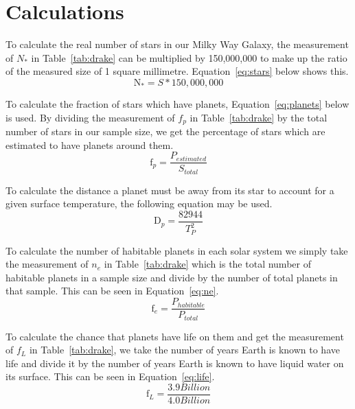 \documentclass{article}
\begin{document}

\section{Calculations}
\label{sec:calc}

To calculate the real number of stars in our Milky Way Galaxy, the measurement of ${N}_{*}$ in Table~\ref{tab:drake} can be
multiplied by 150,000,000 to make up the ratio of the measured size of 1 square millimetre. Equation~\ref{eq:stars} below 
shows this.
\begin{equation}
\label{eq:stars}
\text{N}_{*} = S * 150,000,000
\end{equation}

To calculate the fraction of stars which have planets, Equation~\ref{eq:planets} below is used. By dividing the measurement of
${f}_{p}$ in Table~\ref{tab:drake} by the total number of stars in our sample size, we get the percentage of stars which are 
estimated to have planets around them.
\begin{equation}
\label{eq:planets}
\text{f}_{p} = \frac{{P}_{estimated}}{{S}_{total}}
\end{equation}

To calculate the distance a planet must be away from its star to account for a given surface temperature, the following
equation may be used.
\begin{equation}
\label{eq:mm}
\text{D}_{p} = \frac{82944}{{T}_{P}^{2}}
\end{equation}

To calculate the number of habitable planets in each solar system we simply take the measurement of 
${n}_{e}$ in Table~\ref{tab:drake} which is the total number of habitable planets in a sample size and divide by the number 
of total planets in that sample. This can be seen in Equation~\ref{eq:ne}.
\begin{equation}
\label{eq:ne}
\text{f}_{e} = \frac{{P}_{habitable}}{{P}_{total}}
\end{equation}

To calculate the chance that planets have life on them and get the measurement of ${f}_{L}$ in Table~\ref{tab:drake}, 
we take the number of years Earth is known to have life and divide it by the number of years Earth is known to have liquid
water on its surface. This can be seen in Equation~\ref{eq:life}.
\begin{equation}
\label{eq:life}
\text{f}_{L} = \frac{3.9 Billion}{4.0 Billion}
\end{equation}
\end{document}
